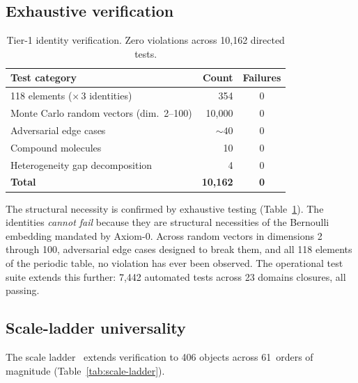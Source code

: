 \documentclass[
  aps,
  prd,
  twocolumn,
  superscriptaddress,
  nofootinbib,
  floatfix
]{revtex4-2}
\begin{document}
\subsection{Exhaustive verification}

\begin{table}[t]
\caption{\label{tab:tier1-tests}Tier-1 identity verification.
Zero violations across 10{,}162 directed tests.}
\begin{ruledtabular}
\begin{tabular}{lrc}
Test category & Count & Failures \\
\midrule
118 elements ($\times\,3$ identities) & 354 & 0 \\
Monte Carlo random vectors (dim.\ 2--100) & 10{,}000 & 0 \\
Adversarial edge cases & $\sim\!40$ & 0 \\
Compound molecules & 10 & 0 \\
Heterogeneity gap decomposition & 4 & 0 \\
\midrule
\textbf{Total} & \textbf{10{,}162} & \textbf{0}
\end{tabular}
\end{ruledtabular}
\end{table}

The structural necessity is confirmed by exhaustive testing
(Table~\ref{tab:tier1-tests}).  The identities \emph{cannot fail}
because they are structural necessities of the Bernoulli embedding
mandated by Axiom-0.  Across random vectors in dimensions 2 through
100, adversarial edge cases designed to break them, and all 118
elements of the periodic table, no violation has ever been observed.
The operational test suite extends this further: 7{,}442 automated
tests across 23 domains closures, all passing.

\subsection{Scale-ladder universality}

The scale ladder~\cite{umcpmetadatarepo} extends verification to
406 objects across 61~orders of magnitude
(Table~\ref{tab:scale-ladder}).
\end{document}
